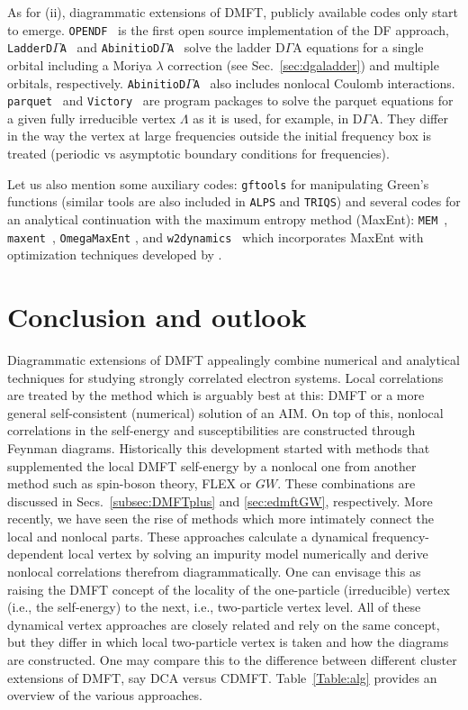 \documentclass[rmp,aps,reprint,amsmath,amssymb,superscriptaddress,showpacs,nofootinbib]{revtex4-1}
\begin{document}
As for (ii), diagrammatic extensions of DMFT, publicly available codes only start to emerge. {\tt OPENDF}~\cite{OPENDF} is the first open source implementation of the DF approach,  {\tt LadderD$\Gamma$A}~\cite{Rohringer2018}  and  {\tt AbinitioD$\Gamma$A}~\cite{Galler2017b} solve the  ladder D$\Gamma$A equations for a single orbital including a Moriya $\lambda$ correction (see Sec.~\ref{sec:dgaladder}) and multiple orbitals, respectively. {\tt AbinitioD$\Gamma$A}~\cite{Galler2017b} also includes nonlocal Coulomb interactions. {\tt parquet}~\cite{Yang2009} and {\tt Victory}~\cite{Li2017}   are program packages to solve the parquet equations for a given fully irreducible vertex $\Lambda$ as it is used, for example, in D$\Gamma$A. They differ in the way the vertex at large frequencies outside the initial frequency box is treated (periodic vs asymptotic boundary conditions for frequencies).

Let us also mention some auxiliary codes: {\tt gftools} \cite{aeantipovgftools} for manipulating Green's functions (similar tools are also included in  {\tt ALPS} and {\tt TRIQS})   and several codes for an analytical continuation with the maximum entropy method (MaxEnt): {\tt MEM}~\cite{Jarrell1996},  {\tt  maxent}~\cite{Levy2017}, {\tt OmegaMaxEnt} \cite{Bergeron2016}, and  {\tt w2dynamics}~\cite{w2dynamics,w2dynamics2018} which incorporates MaxEnt with optimization techniques developed by .


\section{Conclusion and outlook}
\label{sec:conclusion}

Diagrammatic extensions of DMFT appealingly combine numerical and analytical techniques for studying strongly correlated electron systems. Local correlations are treated by the method which is arguably best at this: DMFT or a more general self-consistent (numerical) solution of an AIM. On top of this, nonlocal correlations in the self-energy and susceptibilities are constructed through Feynman diagrams. Historically this development started with methods that supplemented the local DMFT self-energy by a nonlocal one from another method such as spin-boson theory, FLEX or $GW$. These combinations are discussed in  Secs.~\ref{subsec:DMFTplus} and \ref{sec:edmftGW}, respectively. More recently, we have seen the rise of methods which more intimately connect the local and nonlocal parts. These approaches calculate a dynamical frequency-dependent local vertex by solving an impurity model numerically and derive nonlocal correlations therefrom diagrammatically. One can envisage this as raising the DMFT concept of the locality of the one-particle (irreducible) vertex (i.e., the self-energy) to the next, i.e., two-particle vertex level. All of these dynamical vertex approaches are closely related and rely on the same concept, but they differ in which local two-particle vertex is taken and how the diagrams are constructed. One may compare this to the difference between different cluster extensions of DMFT, say DCA versus CDMFT. Table~\ref{Table:alg} provides an overview  of  the various approaches.
\end{document}
